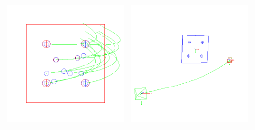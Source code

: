 {\begin{center}
\begin{tabular}{cc}
  \end{tabular}
  \end{center}
\vfill
}{
\vfill
\begin{center}
  \begin{tabular}{cc}
  \includegraphics[height=0.15\textheight]{figures/plots/ex5cimage.png}&
  \includegraphics[height=0.15\textheight]{figures/plots/ex5cscene.png}\\

\end{tabular}
\end{center}}
